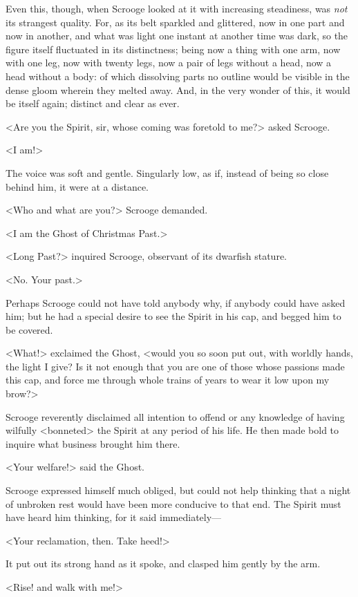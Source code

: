 Even this, though, when Scrooge looked at it with increasing steadiness, was
\emph{not} its strangest quality. For, as its belt sparkled and glittered, now
in one part and now in another, and what was light one instant at another time
was dark, so the figure itself fluctuated in its distinctness; being now a thing
with one arm, now with one leg, now with twenty legs, now a pair of legs without
a head, now a head without a body: of which dissolving parts no outline would be
visible in the dense gloom wherein they melted away. And, in the very wonder of
this, it would be itself again; distinct and clear as ever.

<Are you the Spirit, sir, whose coming was foretold to me?> asked Scrooge.

<I am!>

The voice was soft and gentle. Singularly low, as if, instead of being so close
behind him, it were at a distance.

<Who and what are you?> Scrooge demanded.

<I am the Ghost of Christmas Past.>

<Long Past?> inquired Scrooge, observant of its dwarfish stature.

<No. Your past.>

Perhaps Scrooge could not have told anybody why, if anybody could have asked
him; but he had a special desire to see the Spirit in his cap, and begged him to
be covered.

<What!> exclaimed the Ghost, <would you so soon put out, with worldly hands, the
light I give? Is it not enough that you are one of those whose passions made
this cap, and force me through whole trains of years to wear it low upon my
brow?>

Scrooge reverently disclaimed all intention to offend or any knowledge of having
wilfully <bonneted> the Spirit at any period of his life. He then made bold to
inquire what business brought him there.

<Your welfare!> said the Ghost.

Scrooge expressed himself much obliged, but could not help thinking that a night
of unbroken rest would have been more conducive to that end. The Spirit must
have heard him thinking, for it said immediately—

<Your reclamation, then. Take heed!>

It put out its strong hand as it spoke, and clasped him gently by the arm.

<Rise! and walk with me!>

